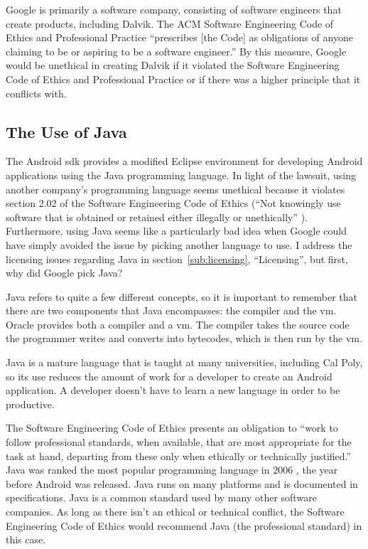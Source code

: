 \documentclass[11pt]{article}
\begin{document}
\begin{multicols}{2}
Google is primarily a software company, consisting of software engineers that
create products, including Dalvik.  The ACM Software Engineering Code of Ethics
and Professional Practice ``prescribes [the Code] as obligations of anyone
claiming to be or aspiring to be a software engineer.'' \cite{secode} By this
measure, Google would be unethical in creating Dalvik if it violated the
Software Engineering Code of Ethics and Professional Practice \cite{secode} or
if there was a higher principle that it conflicts with.


\subsection{The Use of Java} %
\label{sub:java}

The Android \gls{sdk} provides a modified Eclipse environment for developing
Android applications using the Java programming language.  In light of the
lawsuit, using another company's programming language seems unethical because it
violates section 2.02 of the Software Engineering Code of Ethics (``Not
knowingly use software that is obtained or retained either illegally or
unethically'' \cite[\S 2.02]{secode}).  Furthermore, using Java seems like a
particularly bad idea when Google could have simply avoided the issue by picking
another language to use.  I address the licensing issues regarding Java in
section~\ref{sub:licensing}, ``Licensing'', but first, why did Google pick Java?

Java refers to quite a few different concepts, so it is important to remember
that there are two components that Java encompasses: the compiler and the
\gls{vm}.  Oracle provides both a compiler and a \gls{vm}.  The compiler takes
the source code the programmer writes and converts into \glspl{bytecode}, which
is then run by the \gls{vm}.

Java is a mature language that is taught at many universities, including Cal
Poly, so its use reduces the amount of work for a developer to create an Android
application.  A developer doesn't have to learn a new language in order to be
productive.

The Software Engineering Code of Ethics presents an obligation to
``work to follow professional standards, when available, that are most
appropriate for the task at hand, departing from these only when ethically or
technically justified.'' \cite[\S 3.06]{secode}  Java was ranked the most
popular programming language in 2006 \cite[Long term trends]{tiobe}, the year
before Android was released.  Java runs on many platforms and is documented in
specifications.  Java is a common standard used by many other software
companies.  As long as there isn't an ethical or technical conflict, the
Software Engineering Code of Ethics would recommend Java (the professional
standard) in this case.


\end{multicols}
\end{document}
